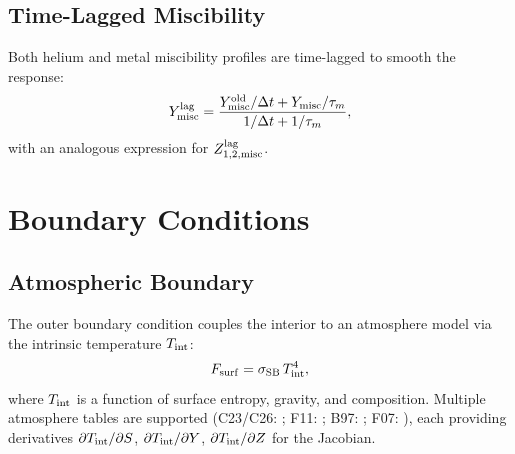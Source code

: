 \documentclass{aastex631}
\newcommand{\pp}{\partial}
\newcommand{\Tint}{T_{\rm int}}
\newcommand{\Yeq}{Y_{\rm misc}}
\begin{document}
\subsection{Time-Lagged Miscibility}

Both helium and metal miscibility profiles are time-lagged to smooth
the response:
\begin{equation}\label{eq:Ym_lag}
  \Yeq^{\rm lag}
  = \frac{\Yeq^{\rm old}/\Delta t + \Yeq/\tau_m}{1/\Delta t + 1/\tau_m},
\end{equation}
with an analogous expression for $Z_{1,2,\rm misc}^{\rm lag}$.

\section{Boundary Conditions}\label{sec:bc}

\subsection{Atmospheric Boundary}

The outer boundary condition couples the interior to an atmosphere model
via the intrinsic temperature $\Tint$:
\begin{equation}
  F_{\rm surf} = \sigma_{\rm SB}\,\Tint^4,
\end{equation}
where $\Tint$ is a function of surface entropy, gravity, and composition.
Multiple atmosphere tables are supported (C23/C26: \citealt{Chen2023};
F11: \citealt{Fortney2011}; B97: \citealt{Burrows1997}; F07:
\citealt{Fortney2007}), each providing derivatives
$\pp\Tint/\pp S$, $\pp\Tint/\pp Y$, $\pp\Tint/\pp Z$ for the Jacobian.
\end{document}
